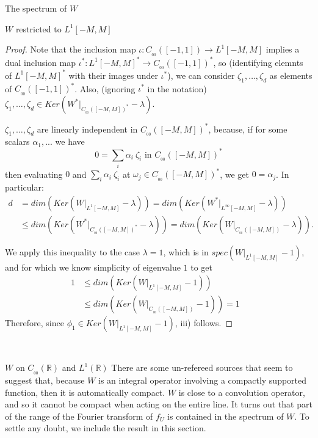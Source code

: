 \documentclass[12pt]{article}
\begin{document}
\begin{section}{The spectrum of $W$ }
\begin{subsection}{$W$ restricted to $L^1[-M,M]$ }
\begin{proof}
Note that the inclusion map $\iota: C_{_{00}}([-1,1]) \longrightarrow L^1[-M,M]$ implies a dual inclusion map $\iota^*: L^1[-M,M]^*  \longrightarrow C_{_{00}}([-1,1])^*$, so (identifying elemnts of $L^1[-M,M]^*$ with their images under $\iota^*$), we can consider $\zeta_1,\dots,\zeta_d$ as elements of $C_{_{00}}([-1,1])^*$. Also, (ignoring $\iota^*$ in the notation) $\zeta_1,\dots,\zeta_d \in Ker\left( W^*\Big|_{C_{_{00}}([-M,M])^*} - \lambda \right)$.

$\zeta_1,\dots,\zeta_d $ are linearly independent in $C_{_{00}}([-M,M])^*$, because, if for some scalars $\alpha_1,...$ we have
$$
0 = \sum_i \alpha_i \ \zeta_i \text{ in } C_{_{00}}([-M,M])^*
$$
then evaluating $0$ and $\sum_i \alpha_i \ \zeta_i$ at $\omega_j \in C_{_{00}}([-M,M])^*$, we get $0 = \alpha_j$. In particular:
\begin{align*}
d &= dim \left( Ker \left( W\Big|_{L^1[-M,M]} - \lambda \right) \right) 
= dim \left( Ker \left( W^* \Big|_{L^{\infty}[-M,M]} - \lambda \right) \right)  &\\
&\le dim \left( Ker \left( W^* \Big|_{C_{_{00}}([-M,M])^*} - \lambda \right) \right) 
= dim \left( Ker \left( W\Big|_{C_{_{00}}([-M,M])} - \lambda \right) \right). &
\end{align*}

We apply this inequality to the case $\lambda = 1$, which is in $spec\left( W\Big|_{L^1[-M,M]} - 1 \right)$, and for which we know simplicity of eigenvalue $1$ to get
\begin{align*}
1 &\le dim \left( Ker \left( W\Big|_{L^1[-M,M]} - 1 \right) \right)  &\\
&\le dim \left( Ker \left( W\Big|_{C_{_{00}}([-M,M])} - 1 \right) \right) = 1 &
\end{align*}
Therefore, since $\phi_1 \in Ker \left( W\Big|_{L^1[-M,M]} - 1 \right)$, iii) follows.
\end{proof}



\end{subsection}

\  
\  



\begin{subsection}{$W$ on $C_{_{0\!0}}(\mathbb{R})$ and $L^1(\mathbb{R})$} \label{W_whole_R}
There are some un-refereed sources that seem to suggest that, because $W$ is an integral operator involving a compactly supported function, then it is automatically compact. $W$ is close to a convolution operator, and so it cannot be compact when acting on the entire line. It turns out that part of the range of the Fourier transform of $f_U$ is contained in the spectrum of $W$. To settle any doubt, we include the result in this section.  


\end{subsection}
\end{section}
\end{document}
